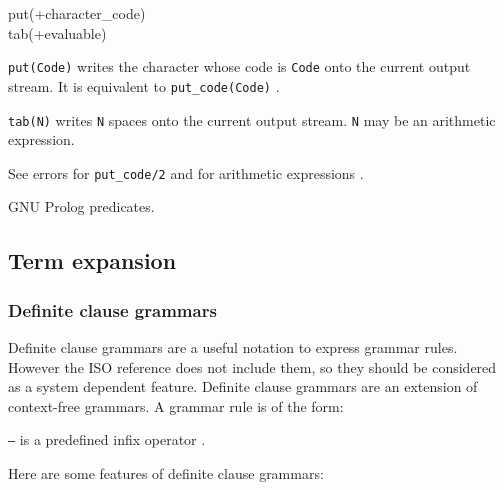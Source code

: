 \begin{TemplatesOneCol}
put(+character\_code)\\
tab(+evaluable)

\end{TemplatesOneCol}

\Description

\texttt{put(Code)} writes the character whose code is \texttt{Code} onto the
current output stream. It is equivalent to \texttt{put\_code(Code)}
.

\texttt{tab(N)} writes \texttt{N} spaces onto the current output
stream. \texttt{N} may be an arithmetic expression.

\Errors

See errors for \texttt{put\_code/2}  and for arithmetic
expressions .

\Portability

GNU Prolog predicates.

\subsection{Term expansion}
\label{Term-expansion}

\subsubsection{Definite clause grammars}
\label{DCG}

Definite clause grammars are a useful notation to express grammar rules.
However the ISO reference does not include them, so they should be considered
as a system dependent feature. Definite clause grammars are an extension of
context-free grammars. A grammar rule is of the form:


\texttt{--{\gt}} is a predefined infix operator .

Here are some features of definite clause grammars:

